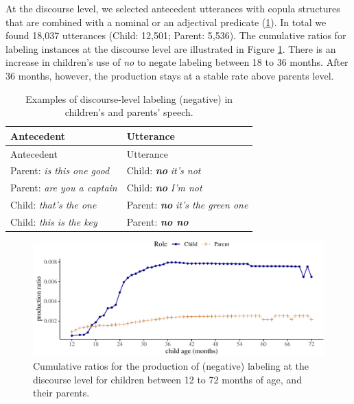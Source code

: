\documentclass[
  man,floatsintext]{apa6}
\begin{document}
At the discourse level, we selected antecedent utterances with copula structures that are combined with a nominal or an adjectival predicate (\ref{tab:dislabel}). In total we found 18,037 utterances (Child: 12,501; Parent: 5,536). The cumulative ratios for labeling instances at the discourse level are illustrated in Figure \ref{fig:learningdiscourse}. There is an increase in children's use of \emph{no} to negate labeling between 18 to 36 months. After 36 months, however, the production stays at a stable rate above parents level.

\begin{longtable}[]{@{}ll@{}}
\caption{\label{tab:dislabel} Examples of discourse-level labeling (negative) in children's and parents' speech.}\tabularnewline
\toprule\noalign{}
Antecedent & Utterance \\
\midrule\noalign{}
\endfirsthead
\toprule\noalign{}
Antecedent & Utterance \\
\midrule\noalign{}
\endhead
\bottomrule\noalign{}
\endlastfoot
Parent: \emph{is this one good} & Child: \textbf{\emph{no}} \emph{it's not} \\
Parent: \emph{are you a captain} & Child: \textbf{\emph{no}} \emph{I'm not} \\
Child: \emph{that's the one} & Parent: \textbf{\emph{no}} \emph{it's the green one} \\
Child: \emph{this is the key} & Parent: \textbf{\emph{no no}} \\
\end{longtable}

\begin{figure}[H]

{\centering \includegraphics{neg_construction_article_files/figure-latex/learningdiscourse-1} 

}

\caption{Cumulative ratios for the production of (negative) labeling at the discourse level for children between 12 to 72 months of age, and their parents.}\label{fig:learningdiscourse}
\end{figure}
\end{document}
